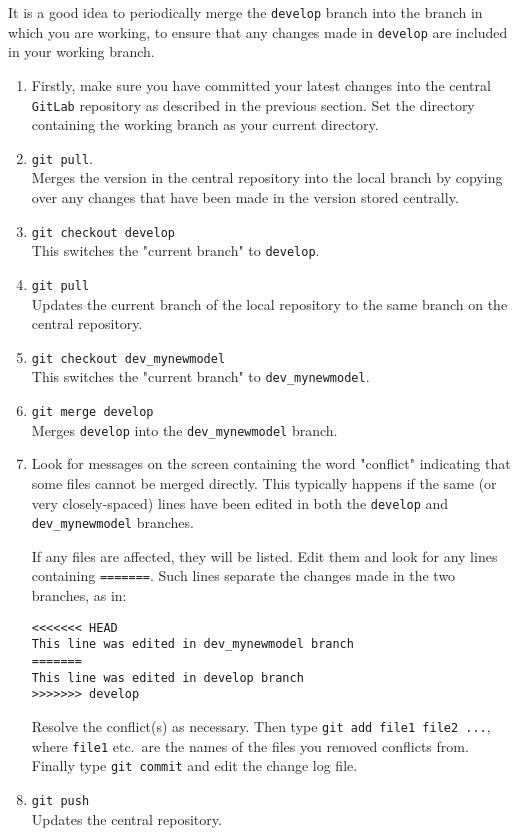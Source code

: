 It is a good idea to periodically merge the \texttt{develop} branch into the branch in which you are working, to ensure that any changes made in \texttt{develop} are included in your working branch.
\begin{enumerate}

\item Firstly, make sure you have committed your latest changes into the
  central \texttt{GitLab} repository as described in the previous section.  Set the directory containing the working branch as your current directory.

\item \texttt{git pull}.  \\
Merges the version in the central repository into the local branch by copying over any changes that have been made in the version stored centrally.

\item \texttt{git checkout develop}  \\
This switches the "current branch" to \texttt{develop}.

\item \texttt{git pull} \\
Updates the current branch of the local repository to the same branch on the central repository.

\item \texttt{git checkout dev\_mynewmodel}  \\
This switches the "current branch" to \texttt{dev\_mynewmodel}.

\item \texttt{git merge develop} \\
Merges \texttt{develop} into the \texttt{dev\_mynewmodel} branch.

\item Look for messages on the screen containing the word "conflict" indicating that some files cannot be merged directly. This typically happens if the
  same (or very closely-spaced) lines have been edited in both the
  \texttt{develop} and \texttt{dev\_mynewmodel} branches.

  If any files are affected, they will be listed.  Edit them and look for any lines containing  \texttt{=======}. Such lines separate the changes made in the two branches, as in:
\begin{verbatim}
<<<<<<< HEAD
This line was edited in dev_mynewmodel branch
=======
This line was edited in develop branch
>>>>>>> develop
\end{verbatim}
  Resolve the conflict(s) as necessary. Then type \texttt{git add file1 file2 ...}, where
  \texttt{file1} etc.\ are the names of the files you removed conflicts
  from. Finally type \texttt{git commit} and edit the change log file.

\item \texttt{git push} \\
Updates the central repository.

\end{enumerate}

